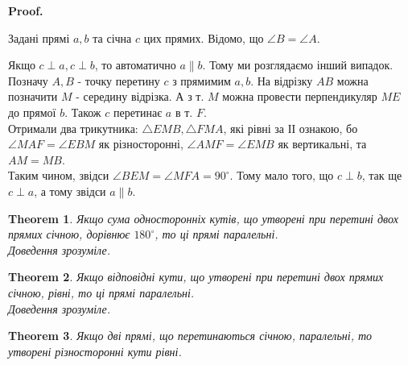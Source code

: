 \documentclass[a4paper, 10pt]{article}
\makeatletter
\theoremstyle{theoremdd}
\newtheorem{theorem}{Theorem}[subsection]
\theoremstyle{theoremdd}
\theoremstyle{theoremdd}
\theoremstyle{theoremdd}
\theoremstyle{theoremdd}
\theoremstyle{theoremdd}
\theoremstyle{theoremdd}
\theoremstyle{theoremdd}
\theoremstyle{theoremdd}
\renewenvironment{proof}[1][Proof.\\]{\par
\pushQED{\hfill \qed}%
\normalfont \topsep6\p@\@plus6\p@\relax
\trivlist
\item\relax
{\bfseries
#1\@addpunct{.}}\hspace\labelsep\ignorespaces
}{%
\popQED\endtrivlist\@endpefalse
}
\makeatother
\begin{document}
\begin{proof}
Задані прямі $a,b$ та січна $c$ цих прямих. Відомо, що $\angle B = \angle A$.
\begin{figure}[H]
\centering
{}
\end{figure}
Якщо $c \perp a, c \perp b$, то автоматично $a \parallel b$. Тому ми розглядаємо інший випадок.\\
Позначу $A,B$ - точку перетину $c$ з прямимим $a,b$. На відрізку $AB$ можна позначити $M$ - середину відрізка. А з т. $M$ можна провести перпендикуляр $ME$ до прямої $b$. Також $c$ перетинає $a$ в т. $F$.\\
Отримали два трикутника: $\triangle EMB, \triangle FMA$, які рівні за ІІ ознакою, бо $\angle MAF = \angle EBM$ як різносторонні, $\angle AMF = \angle EMB$ як вертикальні, та $AM = MB$.\\
Таким чином, звідси $\angle BEM = \angle MFA = 90^\circ$. Тому мало того, що $c \perp b$, так ще $c \perp a$, а тому звідси $a \parallel b$.
\end{proof}

\begin{theorem}
Якщо сума односторонніх кутів, що утворені при перетині двох прямих січною, дорівнює $180^\circ$, то ці прямі паралельні.\\
\textit{Доведення зрозуміле.}
\end{theorem}

\begin{theorem}
Якщо відповідні кути, що утворені при перетині двох прямих січною, рівні, то ці прямі паралельні.\\
\textit{Доведення зрозуміле.}
\end{theorem}

\begin{theorem}
Якщо дві прямі, що перетинаються січною, паралельні, то утворені різносторонні кути рівні.
\end{theorem}
\end{document}
